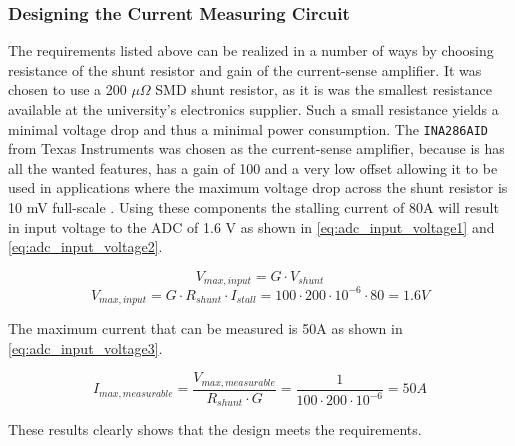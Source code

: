 \subsubsection{Designing the Current Measuring Circuit}
The requirements listed above can be realized in a number of ways by choosing resistance of the shunt resistor and gain of the current-sense amplifier.
It was chosen to use a 200 $\mu \Omega$ SMD shunt resistor, as it is was the smallest resistance available at the university's electronics supplier. 
Such a small resistance yields a minimal voltage drop and thus a minimal power consumption.
The \texttt{INA286AID} from Texas Instruments was chosen as the current-sense amplifier, because is has all the wanted features, has a gain of 100 and a very low offset allowing it to be used in applications where the maximum voltage drop across the shunt resistor is 10 mV full-scale \cite{INA286AID}.
Using these components the stalling current of 80A will result in input voltage to the ADC of 1.6 V as shown in \ref{eq:adc_input_voltage1} and \ref{eq:adc_input_voltage2}.

\begin{equation}
	V_{max,input} = G \cdot V_{shunt}
	\label{eq:adc_input_voltage1}
\end{equation}
\begin{equation}
	V_{max,input} = G \cdot R_{shunt} \cdot I_{stall} = 100 \cdot 200\cdot10^{-6} \cdot 80 = 1.6V
	\label{eq:adc_input_voltage2}
\end{equation}

The maximum current that can be measured is 50A as shown in \ref{eq:adc_input_voltage3}.

\begin{equation}
	I_{max, measurable} = \frac{V_{max, measurable}}{R_{shunt}\cdot G} = \frac{1}{100 \cdot 200\cdot10^{-6} } = 50A
	\label{eq:adc_input_voltage3}
\end{equation}

These results clearly shows that the design meets the requirements.
